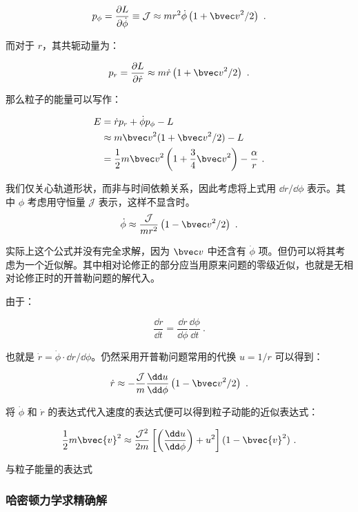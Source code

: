 $$p_\phi = \frac{\partial L}{\partial {\dot \phi}} \equiv \mathcal J \approx mr^2 \dot \phi \left( 1+ {\bvec v}^2/2 \right)~.$$

而对于 $r$，其共轭动量为：

$$p_r = \frac{\partial L}{\partial {\dot r}} \approx m \dot r \left( 1 + {\bvec v}^2/2 \right)~.$$

那么粒子的能量可以写作：

\begin{equation}
\begin{aligned}
E &= \dot r p_r + \dot \phi p_\phi - L \\
&\approx m {\bvec v}^2(1+{\bvec v}^2/2)-L \\
&= \frac{1}{2} m {\bvec v}^2 \left( 1 + \frac{3}{4} {\bvec v}^2 \right) - \frac{\alpha}{r} ~.
\end{aligned}
\end{equation}

我们仅关心轨道形状，而非与时间依赖关系，因此考虑将上式用 $\dd{r}/\dd{\phi}$ 表示。其中 $\phi$ 考虑用守恒量 $\mathcal J$ 表示，这样不显含时。
$$\dot \phi \approx \frac{\mathcal J}{mr^2} \left( 1-{\bvec v}^2/2 \right) ~.$$

实际上这个公式并没有完全求解，因为 $\bvec v$ 中还含有 $\dot \phi$ 项。但仍可以将其考虑为一个近似解。其中相对论修正的部分应当用原来问题的零级近似，也就是无相对论修正时的开普勒问题的解代入。

由于：

$$\frac{\dd r}{\dd t} = \frac{\dd r}{\dd \phi} \frac{\dd \phi} {\dd t}~.$$

也就是 $\dot r = \dot \phi \cdot \dd{r}/\dd{\phi}$。仍然采用开普勒问题常用的代换 $u = 1/r$ 可以得到：

\begin{equation}
\dot r \approx - \frac{\mathcal J}{m} \frac{\dd u}{\dd \phi} \left(1-{\bvec v}^2/2\right)
~.\end{equation}


将 $\dot \phi$ 和 $\dot r$ 的表达式代入速度的表达式便可以得到粒子动能的近似表达式：

\begin{equation}
\frac{1}{2} m \bvec{v}^2 \approx \frac{\mathcal J^2}{2m} \left[\left(\frac{\dd u}{\dd \phi}\right) + u^2\right] (1-\bvec{v}^2)~.
\end{equation}

与粒子能量的表达式

\subsubsection{哈密顿力学求精确解}
